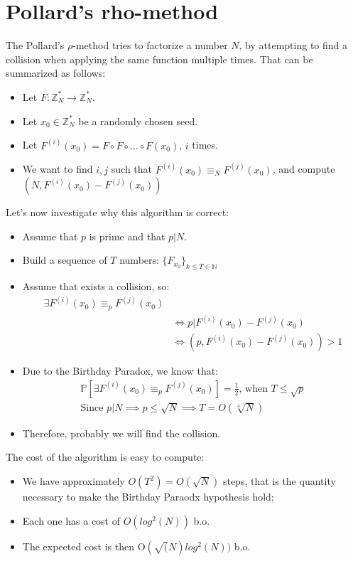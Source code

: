\section{Pollard's rho-method}
The Pollard's $\rho$-method tries to factorize a number $N$, by attempting to find a collision when applying the same function multiple times. That can be summarized as follows:
\begin{itemize}
    \item Let $F: \mathbb{Z}_{N}^{*} \rightarrow \mathbb{Z}_{N}^{*}$.
    \item Let $x_{0} \in \mathbb{Z}_{N}^{*}$ be a randomly chosen seed.
    \item Let $F^{(i)}(x_{0}) = F \circ F \circ \dots \circ F(x_{0})$, $i$ times.
    \item We want to find $i,j$ such that $F^{(i)}(x_{0}) \equiv_{N} F^{(j)}(x_{0})$, and compute $(N, F^{(i)}(x_{0}) - F^{(j)}(x_{0}))$
\end{itemize}
Let's now investigate why this algorithm is correct:
\begin{itemize}
    \item Assume that $p$ is prime and that $p|N$.
    \item Build a sequence of $T$ numbers: $\{F_{x_{0}}\}_{k \leq T \in \mathbb{N}}$
    \item Assume that exists a collision, so:
    \begin{align*}
        \exists F^{(i)}(x_{0}) \equiv_{p} F^{(j)}(x_{0}) & \\
        & \iff p | F^{(i)}(x_{0}) - F^{(j)}(x_{0}) \\
        & \iff (p, F^{(i)}(x_{0}) - F^{(j)}(x_{0})) > 1
    \end{align*}
    \item Due to the Birthday Paradox, we know that:
    \begin{align*}
        \mathbb{P}[\exists F^{(i)}(x_{0}) \equiv_{p} F^{(j)}(x_{0})] = \frac{1}{2} \text{, when } T \leq \sqrt{p} \\
        \text{Since } p|N \implies p \leq \sqrt{N} \implies T = O(\sqrt[4]{N})
    \end{align*}
    \item Therefore, probably we will find the collision.
\end{itemize}
The cost of the algorithm is easy to compute:
\begin{itemize}
    \item We have approximately $O(T^{2}) = O(\sqrt{N})$ steps, that is the quantity necessary to make the Birthday Paraodx hypothesis hold;
    \item Each one has a cost of $O(log^{2}(N))$ b.o.
    \item The expected cost is then O$(\sqrt(N) log^{2}(N))$ b.o.
\end{itemize}

